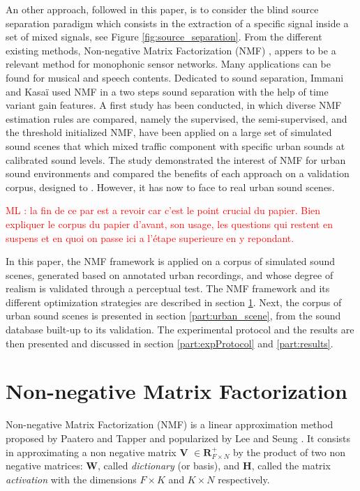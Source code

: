 \documentclass[review,5p,twocolumn,sort&compress,times]{elsarticle}
\newcommand{\ml}[1]{\textcolor{red}{ML : #1}}
\begin{document}
An other approach, followed in this paper, is to consider the blind source separation paradigm which consists in the extraction of a specific signal inside a set of mixed signals, see Figure \ref{fig:source_separation}. From the different existing methods, Non-negative Matrix Factorization (NMF) \cite{lee_learning_1999}, appers to be a relevant method for monophonic sensor networks. Many applications can be found for musical \cite{smaragdis_non-negative_2003, benetos2006musical} and speech \cite{wilson_speech_2008, mysore2011non} contents. Dedicated to sound separation, Immani and Kasa\"i \cite{satoshi_innami_nmf-based_2012} used NMF in a two steps sound separation with the help of time variant gain features. A first study \cite{gloaguen2018Estimation} has been conducted, in which diverse NMF estimation rules are compared, namely the supervised, the semi-supervised, and the threshold initialized NMF, have been applied on a large set of simulated sound scenes that which mixed traffic component with specific urban sounds at calibrated sound levels. The study demonstrated the interest of NMF for urban sound environments and compared the benefits of each approach on a validation corpus, designed to . However, it has now to face to real urban sound scenes.

\ml{la fin de ce par est a revoir car c'est le point crucial du papier. Bien expliquer le corpus du papier d'avant, son usage, les questions qui restent en suspens et en quoi on passe ici a l'étape superieure en y repondant.}

In this paper, the NMF framework is applied on a corpus of simulated sound scenes, generated based on annotated urban recordings, and whose degree of realism is validated through a perceptual test. The NMF framework and its different optimization strategies are described in section \ref{part:nmf}. Next, the corpus of urban sound scenes is presented in section \ref{part:urban_scene}, from the sound database built-up to its validation. The experimental protocol and the results are then presented and discussed in section \ref{part:expProtocol} and \ref{part:results}.

\section{Non-negative Matrix Factorization}\label{part:nmf}

Non-negative Matrix Factorization (NMF) is a linear approximation method proposed by Paatero and Tapper \cite{paatero1994positive} and popularized by Lee and Seung \cite{lee_learning_1999}. It consists in approximating a non negative matrix $\mathbf{V}$ $\in \mathbf{R}^+_{F \times N}$ by the product of two non negative matrices: $\mathbf{W}$, called \textit{dictionary} (or basis), and $\mathbf{H}$, called the matrix \textit{activation} with the dimensions $F \times K$ and $K \times N$ respectively.
\end{document}
